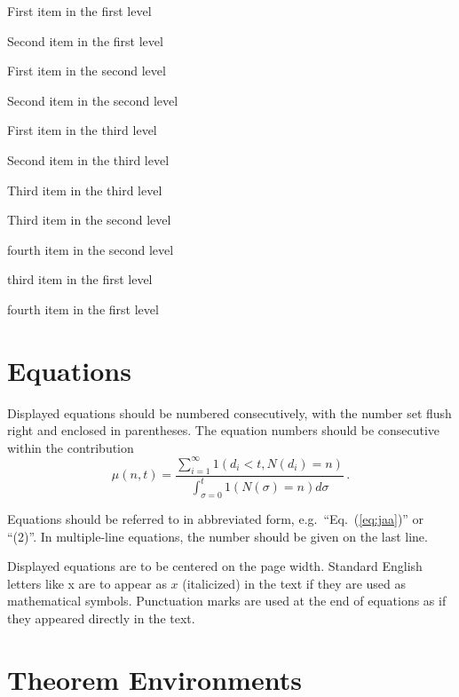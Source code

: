 \documentclass{ws-ijcm}
\begin{document}
\begin{arabiclist}
\item First item in the first level
\item Second item in the first level
\begin{alphlist}[(a)]
\item First item in the second level 
\item Second item in the second level
\begin{romanlist}[iii.]
\item First item in the third level 
\item Second item in the third level
\item Third item in the third level
\end{romanlist}
\item Third item in the second level
\item fourth item in the second level
\end{alphlist}
\item third item in the first level
\item fourth item in the first level
\end{arabiclist}

\section{Equations}
Displayed equations should be numbered consecutively, with the number
set flush right and enclosed in parentheses. The equation numbers
should be consecutive within the contribution
\begin{equation}
\mu(n, t) = \frac{\sum^\infty_{i=1} 1(d_i < t, N(d_i) 
= n)}{\int^t_{\sigma=0} 1(N(\sigma) = n)d\sigma}\,.
\label{eq:jaa}
\end{equation}

Equations should be referred to in abbreviated form,
e.g.~``Eq.~(\ref{eq:jaa})'' or ``(2)''. In multiple-line equations,
the number should be given on the last line.

Displayed equations are to be centered on the page width.  Standard
English letters like x are to appear as $x$ (italicized) in the text
if they are used as mathematical symbols. Punctuation marks are used
at the end of equations as if they appeared directly in the text.

\section{Theorem Environments}
\end{document}
